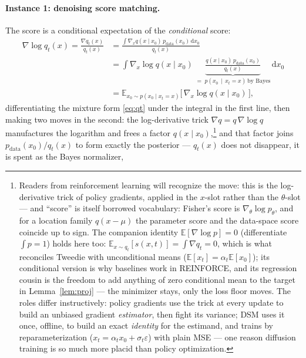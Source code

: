 \documentclass[10pt,a4paper]{article}
\newcommand{\E}{\mathbb{E}}
\newcommand{\dd}{\mathrm{d}}
\newcommand{\score}{s}
\newcommand{\veps}{\varepsilon}
\begin{document}
\paragraph{Instance 1: denoising score matching.}
The score is a conditional expectation of the \emph{conditional} score:
\begin{equation}
\begin{aligned}
\nabla \log q_t(x)
= \frac{\nabla q_t(x)}{q_t(x)}
&= \frac{\int \nabla_x q(x \mid x_0)\, p_{\mathrm{data}}(x_0)\,\dd x_0}{q_t(x)}
\\[2pt]
&= \int \nabla_x \log q(x \mid x_0)\;
\underbrace{\frac{q(x \mid x_0)\, p_{\mathrm{data}}(x_0)}{q_t(x)}}_{
=\; p(x_0 \,\mid\, x_t = x)\ \text{by Bayes}}
\,\dd x_0
\\[2pt]
&= \E_{x_0 \sim p(x_0 \mid x_t = x)}
\big[\, \nabla_x \log q(x \mid x_0) \,\big],
\end{aligned}
\label{eq:dsm-identity}
\end{equation}
differentiating the mixture form \eqref{eq:qt} under the integral in the
first line, then making two moves in the second: the log-derivative
trick $\nabla q = q\, \nabla\log q$ manufactures the logarithm and frees
a factor $q(x \mid x_0)$,\footnote{Readers from reinforcement learning
will recognize the move: this is the log-derivative trick of policy
gradients, applied in the $x$-slot rather than the $\theta$-slot ---
and ``score'' is itself borrowed vocabulary: Fisher's score is
$\nabla_\theta \log p_\theta$, and for a location family $q(x - \mu)$
the parameter score and the data-space score coincide up to sign. The
companion identity $\E[\nabla\log p] = 0$ (differentiate $\int p = 1$)
holds here too: $\E_{x \sim q_t}[\score(x, t)] = \int \nabla q_t = 0$,
which is what reconciles Tweedie with unconditional means
($\E[x_t] = \alpha_t \E[x_0]$); its conditional version is why
baselines work in REINFORCE, and its regression cousin is the freedom
to add anything of zero conditional mean to the target in
Lemma~\ref{lem:proj} --- the minimizer stays, only the loss floor
moves. The roles differ instructively: policy gradients use the trick
at every update to build an unbiased gradient \emph{estimator}, then
fight its variance; DSM uses it once, offline, to build an exact
\emph{identity} for the estimand, and trains by reparameterization
($x_t = \alpha_t x_0 + \sigma_t \veps$) with plain MSE --- one reason
diffusion training is so much more placid than policy optimization.}
and that factor joins
$p_{\mathrm{data}}(x_0) / q_t(x)$ to form exactly the posterior ---
$q_t(x)$ does not disappear, it is spent as the Bayes normalizer,
\end{document}
